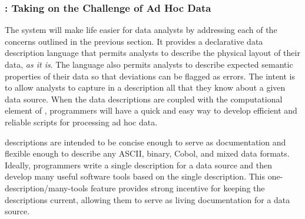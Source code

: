 \documentclass[11pt]{article}
\begin{document}
\subsubsection{\datatype{}:  Taking on the Challenge of Ad Hoc Data}

The \datatype{} system will make life easier for data analysts by addressing
each of the concerns outlined in the previous section.
It provides a declarative data description
language that permits analysts to describe the physical layout of
their data, \textit{as it is}.  The language also permits analysts to
describe expected semantic properties of their data so that deviations can
be flagged as errors. The intent is to allow analysts to capture in a
\datatype{} description all that they know about a given data source.
When the data descriptions are coupled with the computational element
of \datatype{}, programmers will have a quick and easy way to
develop efficient and reliable scripts for processing ad hoc data.



\datatype{} descriptions are intended to be concise enough to serve as
documentation and flexible enough to describe any ASCII, binary,
Cobol, and mixed data formats.  Ideally, programmers write
a single description for a data source and then develop
many useful software tools based on
the single description.  This one-description/many-tools feature provides
strong incentive for keeping the descriptions current, allowing them
to serve as living documentation for a data source.
  
\end{document}

